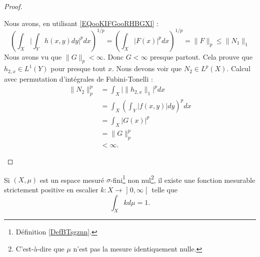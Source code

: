 \begin{proof}
\begin{subproof}
\begin{subproof}
			Nous avons, en utilisant \ref{EQooKIFGooRHBGXl} :
			\begin{equation}
				\left(  \int_X\big| \int_Yh(x,y)dy \big|^pdx   \right)^{1/p}=\left( \int_X| F(x) |^pdx \right)^{1/p}=\| F \|_p\leq \| N_1 \|_1
			\end{equation}
			Nous avons vu que \( \| G \|_p<\infty\). Donc \( G<\infty\) presque partout. Cela prouve que \( h_{2,x}\in L^1(Y)\) pour presque tout \( x\).
			Nous devons voir que \( N_2\in L^p(X)\). Calcul avec permutation d'intégrales de Fubini-Tonelli :
			\begin{subequations}
				\begin{align}
					\| N_2 \|_p^p & =\int_X\Big|  \| h_{2,x} \|_1 \Big|^pdx      \\
					              & =\int_X\left( \int_Y| f(x,y) |dy \right)^pdx \\
					              & =\int_X| G(x) |^p                            \\
					              & =\| G \|_p^p                                 \\
					              & <\infty.
				\end{align}
			\end{subequations}
		\end{subproof}
	\end{subproof}
\end{proof}


\begin{lemma}       \label{LEMooPSBWooGLggTe}
	Si \( (X,\mu)\) est un espace mesuré \( \sigma\)-fini\footnote{Définition \ref{DefBTsgznn}.} non nul\footnote{C'est-à-dire que \( \mu\) n'est pas la mesure identiquement nulle.}, il existe une fonction mesurable strictement positive en escalier \( k\colon X\to \mathopen] 0 , \infty \mathclose[\) telle que
	\begin{equation}
		\int_Xkd\mu=1.
	\end{equation}
\end{lemma}

